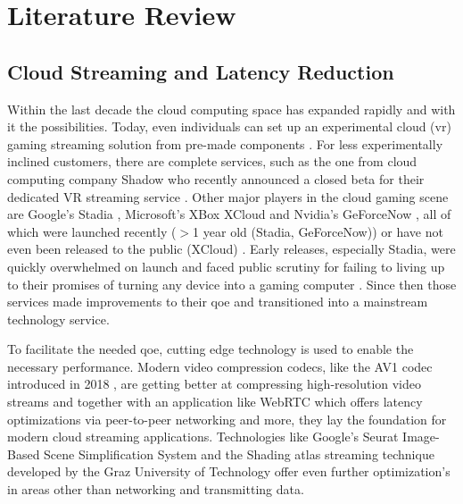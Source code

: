\section{Literature Review}
\label{sec:lit}

\subsection{Cloud Streaming and Latency Reduction}
Within the last decade the cloud computing space has expanded rapidly and with it the possibilities. Today, even individuals can set up an experimental cloud (\acrfull{vr}) gaming streaming solution from pre-made components \parencite{tayoexe} \parencite{clouddesktopguide}. For less experimentally inclined customers, there are complete services, such as the one from cloud computing company Shadow \parencite{shadow} who recently announced a closed beta for their dedicated VR streaming service \parencite{shadowvr}. Other major players in the cloud gaming scene are Google's Stadia \parencite{stadia}, Microsoft's XBox XCloud \parencite{xcloud} and Nvidia's GeForceNow \parencite{geforcenow}, all of which were launched recently ($>$1 year old (Stadia, GeForceNow)) or have not even been released to the public (XCloud) . Early releases, especially Stadia, were quickly overwhelmed on launch and faced public scrutiny for failing to living up to their promises of turning any device into a gaming computer \parencite{stadiaFail}.  Since then those services made improvements to their \acrfull{qoe} and transitioned into a mainstream technology service.

To facilitate the needed \acrshort{qoe}, cutting edge technology is used to enable the necessary performance. Modern video compression codecs, like the AV1 codec introduced in 2018 \parencite{av1}, are getting better at compressing high-resolution video streams and together with an application like WebRTC \parencite{webRTC} which offers latency optimizations via peer-to-peer networking and more, they lay the foundation for modern cloud streaming applications. Technologies like Google's Seurat Image\hyp{}Based Scene Simplification System \parencite{seurat} and the Shading atlas streaming technique developed by the Graz University of Technology \parencite{sas} offer even further optimization's in areas other than networking and transmitting data. 

